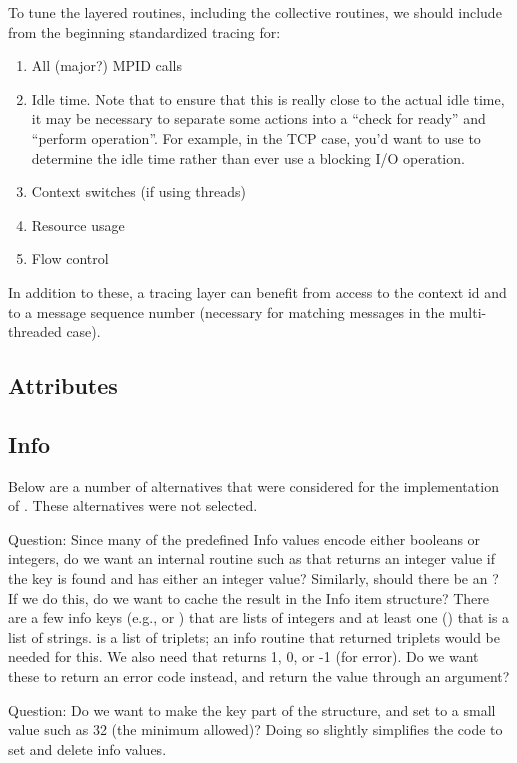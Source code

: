 \documentclass{article}
\begin{document}
To tune the layered routines, including the collective routines, we
should include from the beginning standardized tracing for:
\begin{enumerate}
\item All (major?) MPID calls
\item Idle time.  Note that to ensure that this is really close to the
actual idle time, it may be necessary to separate some actions into a
``check for ready'' and ``perform operation''.  For example, in the
TCP case, you'd want to use  to determine the idle time
rather than ever use a blocking I/O operation.  
\item Context switches (if using threads)
\item Resource usage
\item Flow control
\end{enumerate}
In addition to these, a tracing layer can benefit from access to the
context id and to a message sequence number (necessary for matching
messages in the multi-threaded case).  


\subsection{Attributes} 
\subsection{Info}

Below are a number of alternatives that were considered for the
implementation of .  These alternatives were not
selected.

Question: Since many of the predefined Info values encode either booleans or
integers, do we want an internal routine such as 
that returns an integer value if the key is found and has either an integer
value?  Similarly, should there be an ?
If we do this, do we want to cache the result in the Info item
structure?
There are a few info keys (e.g.,  or
) that are lists of integers and at least one
() that is a list of strings.  
is a list of triplets; an info routine that returned triplets would be
needed for this.
We also need  that returns 1, 0, or -1
(for error).  
Do we want these to return an error code instead, and return the value
through an argument?

Question: Do we want to make the key part of the structure, and set
 to a small value such as 32 (the minimum
allowed)?  Doing so slightly simplifies the code to set and delete info
values. 
\end{document}
